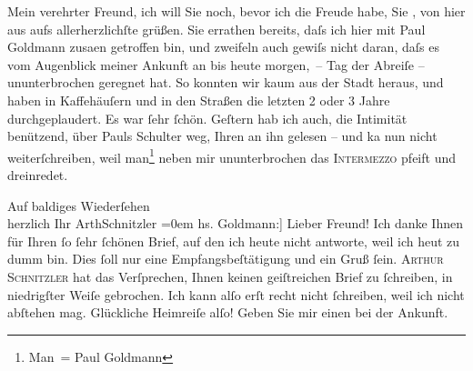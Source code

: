 \pstart{}Mein verehrter Freund,\pend\vspace{0.5em}
\pstart
           ich will Sie noch, bevor ich die Freude habe, Sie \label{K_L03905-1v}\label{K_L03905-1}, von hier aus aufs allerherzlichſte grüßen. Sie errathen
               bereits, daſs ich hier mit Paul Goldmann zusa{\geminationm}en
               getroffen bin, und zweifeln auch gewiſs nicht daran, daſs es vom Augen{\pb}blick meiner Ankunft an bis heute morgen, – Tag der Abreiſe
               – ununterbrochen geregnet hat. So konnten wir kaum aus der Stadt heraus, und haben in
               Kaffehäuſern und in den Straßen die letzten 2 oder 3 Jahre durchgeplaudert. Es war{ }ſehr{ }ſchön. Geſtern hab ich auch, die Intimität benützend, über Pauls Schulter weg,
               Ihren \label{K_L03905-2v}\label{K_L03905-2} an ihn gelesen – {\pb}und ka{\geminationn} nun nicht
               weiterſchreiben, weil man\footnote{\noindent{}Man = Paul Goldmann} neben mir ununterbrochen das \textsc{Intermezzo} pfeift und dreinredet.\pend
           
\pstart
           Auf baldiges Wiederſehen{\\[\baselineskip]}herzlich Ihr \spacefill\mbox{ArthSchnitzler}\pend
           \leftskip=0em{}\vspace{1em}
\pstart{}{\pb}{[}hs. Goldmann:{]} Lieber Freund!\pend\vspace{0.5em}
\pstart
           Ich danke Ihnen für Ihren{ }ſo{ }ſehr{ }ſchönen Brief, auf den ich heute nicht antworte,
               weil ich heut zu dumm bin. Dies{ }ſoll nur eine Empfangsbeſtätigung und ein Gruß{ }ſein.
                  \textsc{Arthur Schnitzler} hat das Verſprechen, Ihnen keinen
               geiſtreichen Brief zu{ }ſchreiben, in niedrigſter Weiſe gebrochen. Ich kann alſo erſt
               recht nicht{ }ſchreiben, weil ich nicht abſtehen mag. Glückliche Heimreiſe alſo! Geben
               Sie mir einen \label{K_L03905-3v}\label{K_L03905-3} bei der
               Ankunft.\pend
           
